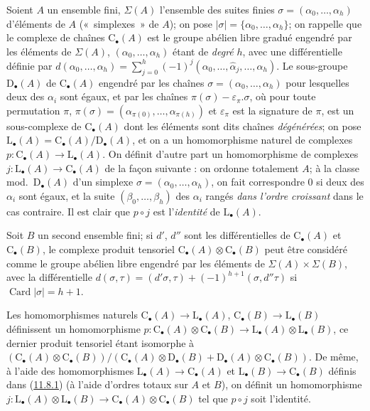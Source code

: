 \begin{env}[11.8.1]
\label{0.11.8.1-fr}
Soient $A$ un ensemble fini, $\Sigma(A)$ l'ensemble des suites finies
$\sigma=(\alpha_0,\ldots,\alpha_h)$ d'éléments de $A$ («~simplexes~» de
$A$); on pose $|\sigma|=\{\alpha_0,\ldots,\alpha_h\}$; on rappelle que le
complexe de chaînes $\mathrm C_\bullet(A)$ est le groupe abélien libre
gradué engendré par les éléments de $\Sigma(A)$,
$(\alpha_0,\ldots,\alpha_h)$ étant de \emph{degré} $h$, avec une différentielle
définie par
$d(\alpha_0,\ldots,\alpha_h)=\sum_{j=0}^{h}(-1)^j(\alpha_0,\ldots,\widehat{\alpha}_j,\ldots,\alpha_h)$.
Le sous-groupe $\mathrm D_\bullet(A)$ de $\mathrm C_\bullet(A)$ engendré par
les chaînes $\sigma=(\alpha_0,\ldots,\alpha_h)$ pour lesquelles deux des
$\alpha_i$ sont égaux, et par les chaînes
$\pi(\sigma)-\varepsilon_\pi.\sigma$, où pour toute permutation $\pi$,
$\pi(\sigma)=(\alpha_{\pi(0)},\ldots,\alpha_{\pi(h)})$
et $\varepsilon_\pi$ est la signature de $\pi$, est un sous-complexe de
$\mathrm C_\bullet(A)$ dont les éléments sont dits chaînes
\emph{dégénérées}; on pose
$\mathrm L_\bullet(A)=\mathrm C_\bullet(A)/\mathrm D_\bullet(A)$, et on a un
homomorphisme naturel de complexes
$p:\mathrm C_\bullet(A)\longrightarrow\mathrm L_\bullet(A)$.
On définit d'autre part un homomorphisme de complexes
$j:\mathrm L_\bullet(A)\longrightarrow\mathrm C_\bullet(A)$
de la façon suivante : on ordonne totalement $A$; à la classe
mod.~$\mathrm D_\bullet(A)$ d'un simplexe
$\sigma=(\alpha_0,\ldots,\alpha_h)$, on fait correspondre $0$ si deux des
$\alpha_i$ sont égaux, et la suite $(\beta_0,\ldots,\beta_h)$ des $\alpha_i$
rangés \emph{dans l'ordre croissant} dans le cas contraire. Il est clair que $p\circ
j$ est l'\emph{identité} de $\mathrm L_\bullet(A)$.
\end{env}

\begin{env}[11.8.2]
\label{0.11.8.2-fr}
Soit $B$ un second ensemble fini; si $d'$, $d''$ sont les différentielles de
$\mathrm C_\bullet(A)$ et $\mathrm C_\bullet(B)$, le complexe produit
tensoriel $\mathrm C_\bullet(A)\otimes\mathrm C_\bullet(B)$ peut être
considéré comme le groupe abélien libre engendré par les éléments de
$\Sigma(A)\times\Sigma(B)$, avec la différentielle
$d(\sigma,\tau)=(d'\sigma,\tau)+(-1)^{h+1}(\sigma,d''\tau)$ si $\operatorname{Card}|\sigma|=h+1$.

Les homomorphismes naturels
$\mathrm C_\bullet(A)\to\mathrm L_\bullet(A)$,
$\mathrm C_\bullet(B)\to\mathrm L_\bullet(B)$ définissent un homomorphisme
$p:\mathrm C_\bullet(A)\otimes\mathrm C_\bullet(B)\longrightarrow\mathrm L_\bullet(A)\otimes\mathrm L_\bullet(B)$,
ce dernier produit tensoriel étant isomorphe à
$(\mathrm C_\bullet(A)\otimes\mathrm C_\bullet(B))/(\mathrm C_\bullet(A)\otimes\mathrm D_\bullet(B)+\mathrm D_\bullet(A)\otimes\mathrm C_\bullet(B))$.
De même, à l'aide des homomorphismes
$\mathrm L_\bullet(A)\to\mathrm C_\bullet(A)$ et
$\mathrm L_\bullet(B)\to\mathrm C_\bullet(B)$ définis dans
(\hyperref[0.11.8.1-fr]{11.8.1}) (à l'aide d'ordres totaux sur $A$ et $B$),
on définit un homomorphisme
$j:\mathrm L_\bullet(A)\otimes\mathrm L_\bullet(B)\longrightarrow\mathrm C_\bullet(A)\otimes\mathrm C_\bullet(B)$
tel que $p\circ j$ soit l'identité.
\end{env}

